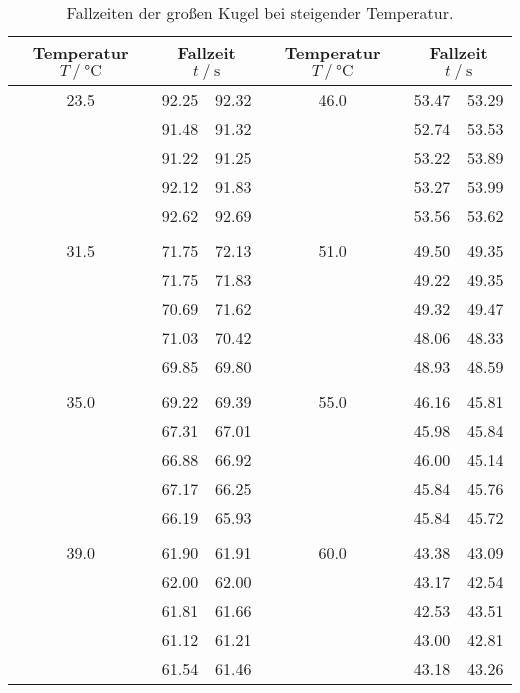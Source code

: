 \begin{table}
    \centering
    \caption{Fallzeiten der großen Kugel bei steigender Temperatur.}
    \label{tab:mess_grKugel_dyn}
    \begin{tabular}{c c c c c c}
        \toprule
        {Temperatur $T\:/\:\si{\celsius}$} & \multicolumn{2}{c}{Fallzeit $t\:/\:\si{\second}$} & {Temperatur $T\:/\:\si{\celsius}$} & \multicolumn{2}{c}{Fallzeit $t\:/\:\si{\second}$} \\
        \midrule
        23.5 & 92.25 & 92.32 & 46.0 & 53.47 & 53.29 \\
             & 91.48 & 91.32 &      & 52.74 & 53.53 \\
             & 91.22 & 91.25 &      & 53.22 & 53.89 \\
             & 92.12 & 91.83 &      & 53.27 & 53.99 \\
             & 92.62 & 92.69 &      & 53.56 & 53.62 \\
                                                    \\
        31.5 & 71.75 & 72.13 & 51.0 & 49.50 & 49.35 \\
             & 71.75 & 71.83 &      & 49.22 & 49.35 \\
             & 70.69 & 71.62 &      & 49.32 & 49.47 \\
             & 71.03 & 70.42 &      & 48.06 & 48.33 \\
             & 69.85 & 69.80 &      & 48.93 & 48.59 \\
                                                    \\
        35.0 & 69.22 & 69.39 & 55.0 & 46.16 & 45.81 \\
             & 67.31 & 67.01 &      & 45.98 & 45.84 \\
             & 66.88 & 66.92 &      & 46.00 & 45.14 \\
             & 67.17 & 66.25 &      & 45.84 & 45.76 \\
             & 66.19 & 65.93 &      & 45.84 & 45.72 \\
                                                    \\
        39.0 & 61.90 & 61.91 & 60.0 & 43.38 & 43.09 \\
             & 62.00 & 62.00 &      & 43.17 & 42.54 \\
             & 61.81 & 61.66 &      & 42.53 & 43.51 \\
             & 61.12 & 61.21 &      & 43.00 & 42.81 \\
             & 61.54 & 61.46 &      & 43.18 & 43.26 \\

\end{tabular}
\end{table}
